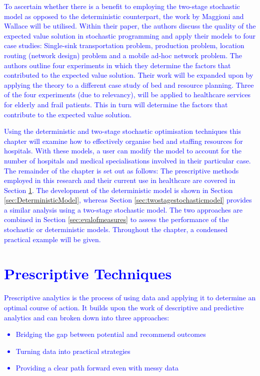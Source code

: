 \documentclass[../thesis.tex]{subfiles}
\begin{document}
\textcolor{blue}{To ascertain whether there is a benefit to employing the two-stage stochastic model as opposed to the deterministic counterpart, the work by Maggioni and Wallace \cite{Maggioni2010} will be utilised. Within their paper, the authors discuss the quality of the expected value solution in stochastic programming and apply their models to four case studies: Single-sink transportation problem, production problem, location routing (network design) problem and a mobile ad-hoc network problem. The authors outline four experiments in which they determine the factors that contributed to the expected value solution. \textcolor{blue}{Their work will be expanded upon by applying the theory to a different case study of bed and resource planning. Three of the four experiments (due to relevancy), will be applied to healthcare services for elderly and frail patients. This in turn will determine the factors that contribute to the expected value solution.} 

Using the deterministic and two-stage stochastic optimisation techniques this chapter will examine how to effectively organise bed and staffing resources for hospitals. With these models, a user can modify the model to account for the number of hospitals and medical specialisations involved in their particular case. The remainder of the chapter is set out as follows:  The prescriptive methods employed in this research and their current use in healthcare are covered in Section \ref{sec:prescriptive}. The development of the deterministic model is shown in Section \ref{sec:DeterministicModel}, whereas Section \ref{sec:twostagestochasticmodel} provides a similar analysis using a two-stage stochastic model. The two approaches are combined in Section \ref{sec:evalofmeasures} to assess the performance of the stochastic or deterministic models. Throughout the chapter, a condensed practical example will be given.

\section{Prescriptive Techniques} \label{sec:prescriptive}

Prescriptive analytics is the process of using data and applying it to determine an optimal course of action. It builds upon the work of descriptive and predictive analytics and can broken down into three approaches:
\begin{itemize}
    \item Bridging the gap between potential and recommend outcomes
    \item Turning data into practical strategies
    \item Providing a clear path forward even with messy data
\end{itemize}

}
\end{document}
